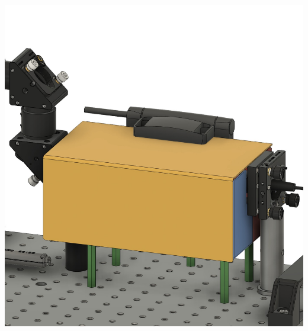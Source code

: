 \begin{minipage}[c]{0.48\textwidth}
    \begin{center}
        \includegraphics[width=\textwidth]{assets/figures/Protections_laser/Securite_mecanique/Protection_entree_laser/model_3D_ferme.jpeg}
    \end{center}
    \label{model_3D_ferme}
\end{minipage}\hfill
